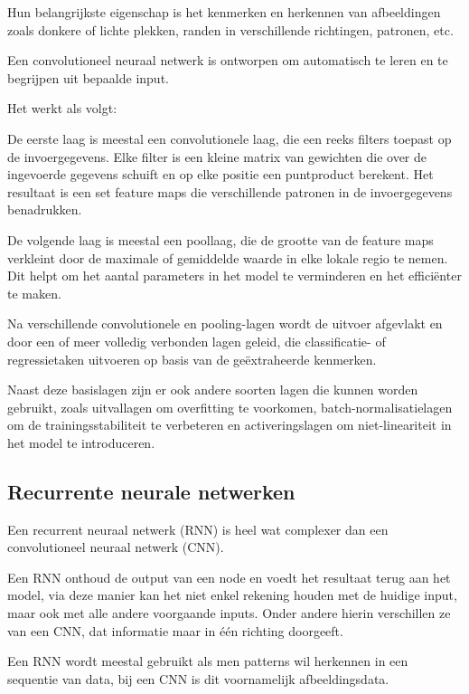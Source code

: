 Hun belangrijkste eigenschap is het kenmerken en herkennen van afbeeldingen zoals donkere of lichte plekken, randen in verschillende richtingen, patronen, etc.

Een convolutioneel neuraal netwerk is ontworpen om automatisch te leren en te begrijpen uit bepaalde input. 

Het werkt als volgt: 

De eerste laag is meestal een convolutionele laag, die een reeks filters toepast op de invoergegevens. Elke filter is een kleine matrix van gewichten die over de ingevoerde gegevens schuift en op elke positie een puntproduct berekent. Het resultaat is een set feature maps die verschillende patronen in de invoergegevens benadrukken.

De volgende laag is meestal een poollaag, die de grootte van de feature maps verkleint door de maximale of gemiddelde waarde in elke lokale regio te nemen. Dit helpt om het aantal parameters in het model te verminderen en het efficiënter te maken.

Na verschillende convolutionele en pooling-lagen wordt de uitvoer afgevlakt en door een of meer volledig verbonden lagen geleid, die classificatie- of regressietaken uitvoeren op basis van de geëxtraheerde kenmerken.

Naast deze basislagen zijn er ook andere soorten lagen die kunnen worden gebruikt, zoals uitvallagen om overfitting te voorkomen, batch-normalisatielagen om de trainingsstabiliteit te verbeteren en activeringslagen om niet-lineariteit in het model te introduceren.

\cite{li2021survey}

\subsection{Recurrente neurale netwerken}

Een recurrent neuraal netwerk (RNN) is heel wat complexer dan een convolutioneel neuraal netwerk (CNN). 

Een RNN onthoud de output van een node en voedt het resultaat terug aan het model, via deze manier kan het niet enkel rekening houden met de huidige input, maar ook met alle andere voorgaande inputs. Onder andere hierin verschillen ze van een CNN, dat informatie maar in één richting doorgeeft.

Een RNN wordt meestal gebruikt als men patterns wil herkennen in een sequentie van data, bij een CNN is dit voornamelijk afbeeldingsdata.

